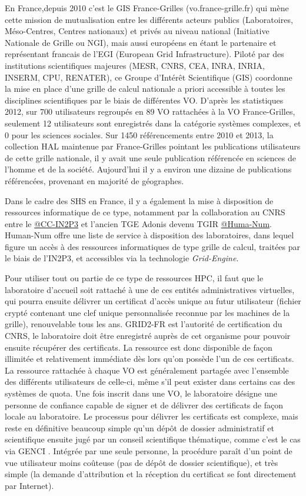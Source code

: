 En France,depuis 2010 c'est le GIS France-Grilles (vo.france-grille.fr) qui mène cette mission de mutualisation entre les différents acteurs publics (Laboratoires, Méso-Centres, Centres nationaux) et privés au niveau national (Initiative Nationale de Grille ou NGI), mais aussi européens en étant le partenaire et représentant francais de l'EGI (European Grid Infrastructure). Piloté par des institutions scientifiques majeures (MESR, CNRS, CEA, INRA, INRIA, INSERM, CPU, RENATER), ce Groupe d'Intérêt Scientifique (GIS) coordonne la mise en place d'une grille de calcul nationale a priori accessible à toutes les disciplines scientifiques par le biais de différentes VO. D'après les statistiques 2012, sur 700 utilisateurs regroupés en 89 VO rattachées à la VO France-Grilles, seulement 12 utilisateurs sont enregistrés dans la catégorie systèmes complexes, et 0 pour les sciences sociales. Sur 1450 référencements entre 2010 et 2013, la collection HAL maintenue par France-Grilles pointant les publications utilisateurs de cette grille nationale, il y avait une seule publication référencée en sciences de l'homme et de la société. Aujourd'hui il y  a environ une dizaine de publications référencées, provenant en majorité de géographes.

Dans le cadre des SHS en France, il y a également la mise à disposition de ressources informatique de ce type, notamment par la collaboration au CNRS entre le \href{http://cc.in2p3.fr/}{@CC-IN2P3} et l'ancien TGE Adonis devenu TGIR \href{http://www.huma-num.fr/}{@Huma-Num}. Human-Num offre une liste de service à disposition des laboratoires, dans lequel figure un accès à des ressources informatiques de type grille de calcul, traitées par le biais de l'IN2P3, et accessibles via la technologie \textit{Grid-Engine}.

Pour utiliser tout ou partie de ce type de ressources HPC, il faut que le laboratoire d'accueil soit rattaché à une de ces entités administratives virtuelles, qui pourra ensuite délivrer un certificat d'accès unique au futur utilisateur (fichier crypté contenant une clef unique personnalisée reconnue par les machines de la grille), renouvelable tous les ans. GRID2-FR est l'autorité de certification du CNRS, le laboratoire doit être enregistré auprès de cet organisme pour pouvoir ensuite récupérer des certificats. La ressource est donc disponible de façon illimitée et relativement immédiate dès lors qu'on possède l'un de ces certificats. La ressource rattachée à chaque VO est généralement partagée avec l'ensemble des différents utilisateurs de celle-ci, même s'il peut exister dans certains cas des systèmes de quota. Une fois inscrit dans une VO, le laboratoire désigne une personne de confiance capable de signer et de délivrer des certificats de façon locale au laboratoire. Le processus pour délivrer les certificats est complexe, mais reste en définitive beaucoup simple qu'un dépôt de dossier administratif et scientifique ensuite jugé par un conseil scientifique thématique, comme c'est le cas via GENCI \autocites{GENCI2014,GENCI2015}. Intégrée par une seule personne, la procédure paraît d'un point de vue utilisateur moins coûteuse (pas de dépôt de dossier scientifique), et très simple (la demande d'attribution et la réception du certificat se font directement par Internet).

